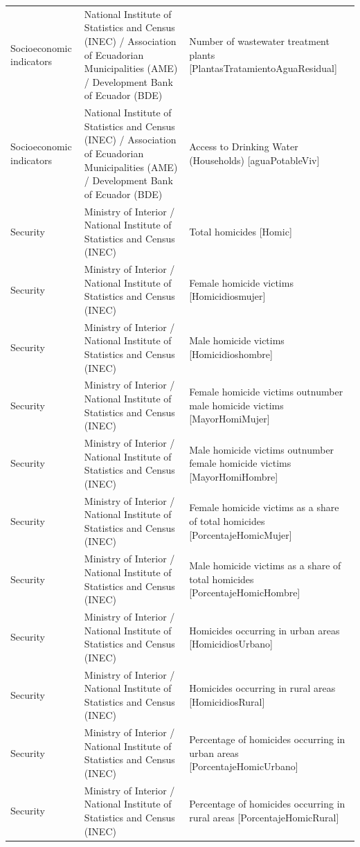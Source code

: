 \documentclass[10pt,a4paper]{article}
\begin{document}
\begin{longtable}{@{}>{\raggedright\arraybackslash}p{3.5cm}>{\raggedright\arraybackslash}p{5.6cm}>{\raggedright\arraybackslash}p{\dimexpr\textwidth-9.1cm-4\tabcolsep\relax}@{}}
Socioeconomic indicators & National Institute of Statistics and Census (INEC) / Association of Ecuadorian Municipalities (AME) / Development Bank of Ecuador (BDE) & Number of wastewater treatment plants [PlantasTratamientoAguaResidual]\\
Socioeconomic indicators & National Institute of Statistics and Census (INEC) / Association of Ecuadorian Municipalities (AME) / Development Bank of Ecuador (BDE) & Access to Drinking Water (Households) [aguaPotableViv]\\
Security & Ministry of Interior / National Institute of Statistics and Census (INEC) & Total homicides [Homic]\\
Security & Ministry of Interior / National Institute of Statistics and Census (INEC) & Female homicide victims [Homicidiosmujer]\\
Security & Ministry of Interior / National Institute of Statistics and Census (INEC) & Male homicide victims [Homicidioshombre]\\
Security & Ministry of Interior / National Institute of Statistics and Census (INEC) & Female homicide victims outnumber male homicide victims [MayorHomiMujer]\\
Security & Ministry of Interior / National Institute of Statistics and Census (INEC) & Male homicide victims outnumber female homicide victims [MayorHomiHombre]\\
Security & Ministry of Interior / National Institute of Statistics and Census (INEC) & Female homicide victims as a share of total homicides [PorcentajeHomicMujer]\\
Security & Ministry of Interior / National Institute of Statistics and Census (INEC) & Male homicide victims as a share of total homicides [PorcentajeHomicHombre]\\
Security & Ministry of Interior / National Institute of Statistics and Census (INEC) & Homicides occurring in urban areas [HomicidiosUrbano]\\
Security & Ministry of Interior / National Institute of Statistics and Census (INEC) & Homicides occurring in rural areas [HomicidiosRural]\\
Security & Ministry of Interior / National Institute of Statistics and Census (INEC) & Percentage of homicides occurring in urban areas [PorcentajeHomicUrbano]\\
Security & Ministry of Interior / National Institute of Statistics and Census (INEC) & Percentage of homicides occurring in rural areas [PorcentajeHomicRural]\\

\end{longtable}
\end{document}
